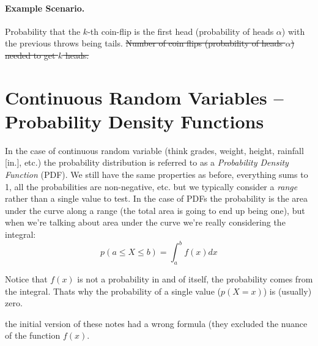 \paragraph{Example Scenario.} 
{\color{red}Probability that the $k$-th coin-flip is the first head (probability of heads $\alpha$) with the previous throws being tails.}
\sout{Number of coin flips (probability of heads $\alpha$) needed to get $k$ heads. }

\begin{center}
\end{center}

\section{Continuous Random Variables -- Probability Density Functions}
In the case of continuous random variable (think grades, weight, height, rainfall [in.], etc.) 
the probability distribution is referred to as a \emph{Probability Density Function} (PDF). 
We still have the same properties as before, everything sums to 1, all the probabilities are non-negative, etc.
but we typically consider a \textit{range} rather than a single value to test. 
In the case of PDFs the probability is the area under the curve along a range (the total area is going to end up being one), 
but when we're talking about area under the curve we're really considering the integral:
\[p(a \le X \le b) = \int_{a}^{b} f(x)dx \]

Notice that $f(x)$ is not a probability in and of itself, the probability comes from the integral. 
Thats why the probability of a single value ($p(X=x)$) is (usually) zero. 

\begin{aside}
the initial version of these notes had a wrong formula (they excluded the nuance of the function $f(x)$. 
\end{aside}

